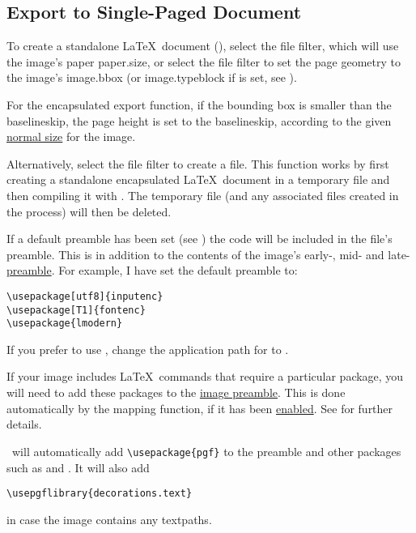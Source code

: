 
\subsection{Export to Single-Paged Document}\label{sec:exportdoc}

To create a standalone \LaTeX\ document (), select
the  file filter, which will use the image's
paper \gls{paper.size}, or select the  file filter to
set the page geometry to the image's \gls{image.bbox} (or \gls{image.typeblock}
if  is set, see
).

\begin{information}
For the encapsulated export function,
if the bounding box is smaller than the baselineskip, the page
height is set to the baselineskip, according to the given
\hyperref[sec:normalsize]{normal size} for the image.
\end{information}

Alternatively, select the  file filter to create
a  file.  This function works by first creating a
standalone encapsulated \LaTeX\ document in a temporary file and
then compiling it with . The temporary file (and any
associated files created in the process) will then be deleted.

If a default preamble has been set (see
) the code will be included in the
 file's preamble.  This is in
addition to the contents of the image's early-, mid- and
late-\hyperref[sec:preamble]{preamble}. For example, I have set the
default preamble to:
\begin{verbatim}
\usepackage[utf8]{inputenc}
\usepackage[T1]{fontenc}
\usepackage{lmodern}
\end{verbatim}
If you prefer to use , change the application path for
 to .

If your image includes \LaTeX\ commands that require a particular
package, you will need to add these packages to the
\hyperref[sec:preamble]{image preamble}. This is done automatically
by the mapping function, if it has been
\hyperref[mi:texmappings]{enabled}.  See
 for further details.

\FlowframTk\ will automatically add
\verb|\usepackage{pgf}| to the preamble and other packages such as
 and . It will also add
\begin{verbatim}
\usepgflibrary{decorations.text}
\end{verbatim}
in case the image contains any \glspl{textpath}.

